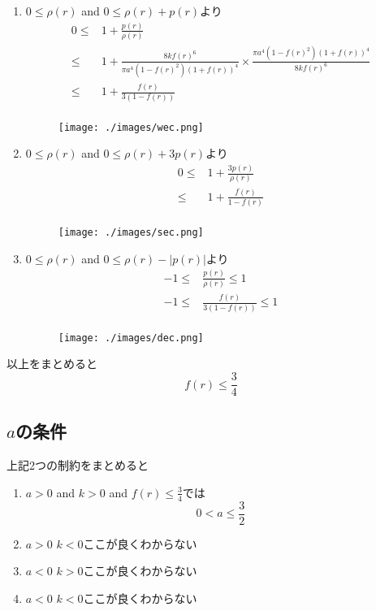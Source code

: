 \documentclass[dvipdfmx]{report} %
\begin{document}
\begin{enumerate}[(1)\,]
\item{$0 \leq \rho(r)$ and $0 \leq \rho(r) + p(r)$より}
\begin{equation*}
\begin{split}
	0 \leq & 1 + \frac{ p(r) }{ \rho(r) }\\
	\leq & 1 + \frac{ 8 k f(r)^6 }{ \pi a^4 ( 1 - f(r)^2 )( 1 + f(r) )^4 } \times \frac{ \pi a^4 ( 1 - f(r)^2 )( 1 + f(r) )^4 }{ 8 k f(r)^6 }\\
	\leq & 1 + \frac{ f(r) }{ 3( 1 - f(r) ) }\\
\end{split}
\end{equation*}
\begin{figure}[H]
\centering
\texttt{[image: ./images/wec.png]}
\caption{}
\label{}
\end{figure}

\item{$0 \leq \rho(r)$ and $0 \leq \rho(r) + 3p(r)$より}
\begin{equation*}
\begin{split}
	0 \leq & 1 + \frac{ 3p(r) }{ \rho(r) }\\
	\leq & 1 + \frac{ f(r) }{ 1 - f(r) }\\
\end{split}
\end{equation*}
\begin{figure}[H]
\centering
\texttt{[image: ./images/sec.png]}
\caption{}
\label{}
\end{figure}

\item{$0 \leq \rho(r)$ and $0 \leq \rho(r) - |p(r)|$より}
\begin{equation*}
\begin{split}
	-1 \leq & \frac{ p(r) }{ \rho(r) } \leq 1\\
	-1 \leq & \frac{ f(r) }{ 3 (1 - f(r) ) } \leq 1\\
\end{split}
\end{equation*}
\begin{figure}[H]
\centering
\texttt{[image: ./images/dec.png]}
\caption{}
\label{}
\end{figure}
\end{enumerate}
以上をまとめると
\[f(r) \leq \frac{3}{4}\]

\subsection{$a$の条件}
上記2つの制約をまとめると
\begin{enumerate}[(1)\,]
\item{$a>0$ and $k>0$ and $f(r) \leq \frac{3}{4}$では}\\
\[0 < a \leq \frac{3}{2}\]
\item{$a>0$  $k<0$ここが良くわからない}
\item{$a<0$  $k>0$ここが良くわからない}
\item{$a<0$  $k<0$ここが良くわからない}
\end{enumerate}
\end{document}
